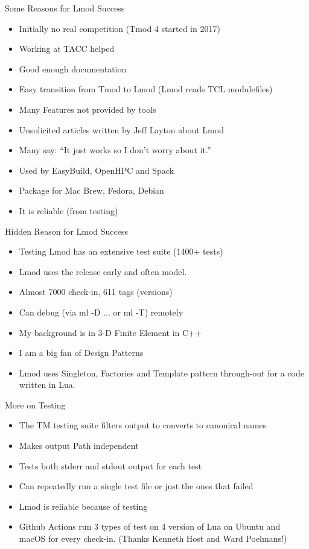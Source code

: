 \documentclass{beamer}
\begin{document}
\begin{frame}{Some Reasons for Lmod Success}
  \begin{itemize}
    \item Initially no real competition (Tmod 4 started in 2017)
    \item Working at TACC helped
    \item Good enough documentation
    \item Easy transition from Tmod to Lmod (Lmod reads TCL
      modulefiles)
    \item Many Features not provided by tools
    \item Unsolicited articles written by Jeff Layton about Lmod
    \item Many say: ``It just works so I don't worry about it.''
    \item Used by EasyBuild, OpenHPC and Spack
    \item Package for Mac Brew, Fedora, Debian
    \item It is reliable (from testing)
  \end{itemize}
\end{frame}

\begin{frame}{Hidden Reason for Lmod Success}
  \begin{itemize}
    \item Testing Lmod has an extensive test suite (1400+ tests)
    \item Lmod uses the release early and often model.
    \item Almost 7000 check-in, 611 tags (versions)
    \item Can debug (via ml -D ... or ml -T) remotely
    \item My background is in 3-D Finite Element in C++
    \item I am a big fan of Design Patterns
    \item Lmod uses Singleton, Factories and Template pattern
      through-out for a code written in Lua.
  \end{itemize}
\end{frame}

\begin{frame}{More on Testing}
  \begin{itemize}
    \item The TM testing suite filters output to converts to canonical
      names
    \item Makes output Path independent
    \item Tests both stderr and stdout output for each test
    \item Can repeatedly run a single test file or just the ones that
      failed
    \item Lmod is reliable because of testing
    \item Github Actions run 3 types of test on 4 version of Lua on
      Ubuntu and macOS for every check-in. (Thanks Kenneth Host and
      Ward Poelmans!)
  \end{itemize}
\end{frame}
\end{document}
